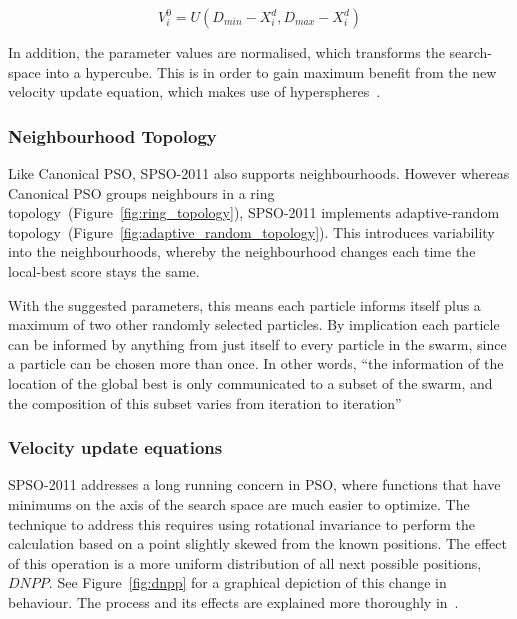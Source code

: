 \documentclass{csfourzero}
\begin{document}
\begin{equation}
  V_i^0 = U(D_{min} - X_i^d, D_{max} - X_i^d)
\end{equation}

In addition, the parameter values are normalised, which transforms the
search-space into a hypercube. This is in order to gain maximum benefit from the
new velocity update equation, which makes use of
hyperspheres~\cite{Clerc:2012to}.

\subsubsection{Neighbourhood Topology}

Like Canonical PSO, SPSO-2011 also supports neighbourhoods. However whereas
Canonical PSO groups neighbours in a ring
topology~(Figure~\ref{fig:ring_topology}), SPSO-2011 implements adaptive-random
topology~(Figure~\ref{fig:adaptive_random_topology}). This introduces
variability into the neighbourhoods, whereby the neighbourhood changes each
time the local-best score stays the same.

With the suggested parameters, this means each particle informs itself plus a
maximum of two other randomly selected particles. By implication each particle
can be informed by anything from just itself to every particle in the swarm,
since a particle can be chosen more than once. In other words, ``the information
of the location of the global best is only communicated to a subset of the
swarm, and the composition of this subset varies from iteration to
iteration''~\cite{Miranda:2007er}

\subsubsection{Velocity update equations}

SPSO-2011 addresses a long running concern in PSO, where functions that
have minimums on the axis of the search space are much easier to optimize. The
technique to address this requires using rotational invariance to perform the
calculation based on a point slightly skewed from the known positions. The
effect of this operation is a more uniform distribution of all next possible
positions, $DNPP$. See Figure~\ref{fig:dnpp} for a graphical depiction of this
change in behaviour.  The process and its effects are explained more thoroughly
in~\cite{ZambranoBigiarini:2013dl}.
\end{document}
